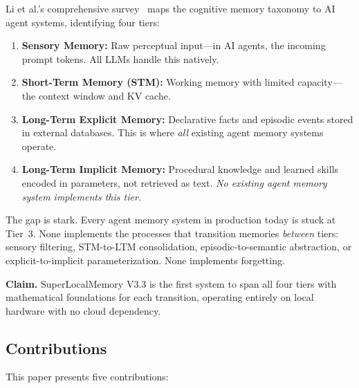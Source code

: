 Li et al.'s comprehensive survey~\cite{cognitive-memory-survey} maps the cognitive memory taxonomy to AI agent systems, identifying four tiers:

\begin{enumerate}[leftmargin=*, topsep=4pt, itemsep=2pt]
  \item \textbf{Sensory Memory:} Raw perceptual input---in AI agents, the incoming prompt tokens. All LLMs handle this natively.
  \item \textbf{Short-Term Memory (STM):} Working memory with limited capacity---the context window and KV cache.
  \item \textbf{Long-Term Explicit Memory:} Declarative facts and episodic events stored in external databases. This is where \emph{all} existing agent memory systems operate.
  \item \textbf{Long-Term Implicit Memory:} Procedural knowledge and learned skills encoded in parameters, not retrieved as text. \emph{No existing agent memory system implements this tier.}
\end{enumerate}

The gap is stark. Every agent memory system in production today is stuck at Tier~3. None implements the processes that transition memories \emph{between} tiers: sensory filtering, STM-to-LTM consolidation, episodic-to-semantic abstraction, or explicit-to-implicit parameterization. None implements forgetting.

\textbf{Claim.} SuperLocalMemory V3.3 is the first system to span all four tiers with mathematical foundations for each transition, operating entirely on local hardware with no cloud dependency.

\subsection{Contributions}

This paper presents five contributions:

